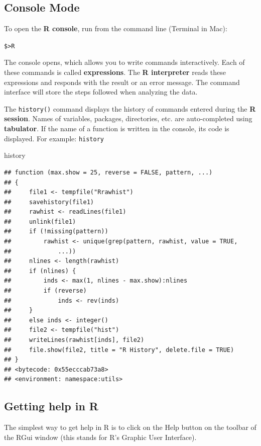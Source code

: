 \documentclass[
]{book}
\newenvironment{Shaded}{\begin{snugshade}}{\end{snugshade}}
\newcommand{\NormalTok}[1]{#1}
\theoremstyle{definition}
\theoremstyle{definition}
\theoremstyle{definition}
\theoremstyle{definition}
\theoremstyle{remark}
\begin{document}
\hypertarget{console-mode}{%
\subsection{Console Mode}\label{console-mode}}

To open the \textbf{R console}, run from the command line (Terminal in Mac):

\texttt{\$\textgreater{}R}

The console opens, which allows you to write commands interactively. Each of these commands is called \textbf{expressions}. The \textbf{R interpreter} reads these expressions and responds with the result or an error message. The command interface will store the steps followed when analyzing the data.

The \texttt{history()} command displays the history of commands entered during the \textbf{R session}. Names of variables, packages, directories, etc. are auto-completed using \textbf{tabulator}. If the name of a function is written in the console, its code is displayed. For example: \texttt{history}

\begin{Shaded}
\begin{Highlighting}[]
\NormalTok{history}
\end{Highlighting}
\end{Shaded}

\begin{verbatim}
## function (max.show = 25, reverse = FALSE, pattern, ...) 
## {
##     file1 <- tempfile("Rrawhist")
##     savehistory(file1)
##     rawhist <- readLines(file1)
##     unlink(file1)
##     if (!missing(pattern)) 
##         rawhist <- unique(grep(pattern, rawhist, value = TRUE, 
##             ...))
##     nlines <- length(rawhist)
##     if (nlines) {
##         inds <- max(1, nlines - max.show):nlines
##         if (reverse) 
##             inds <- rev(inds)
##     }
##     else inds <- integer()
##     file2 <- tempfile("hist")
##     writeLines(rawhist[inds], file2)
##     file.show(file2, title = "R History", delete.file = TRUE)
## }
## <bytecode: 0x55ecccab73a8>
## <environment: namespace:utils>
\end{verbatim}

\hypertarget{getting-help-in-r}{%
\subsection{Getting help in R}\label{getting-help-in-r}}

The simplest way to get help in R is to click on the Help button on the toolbar of the RGui window (this stands for R's Graphic User Interface).
\end{document}
